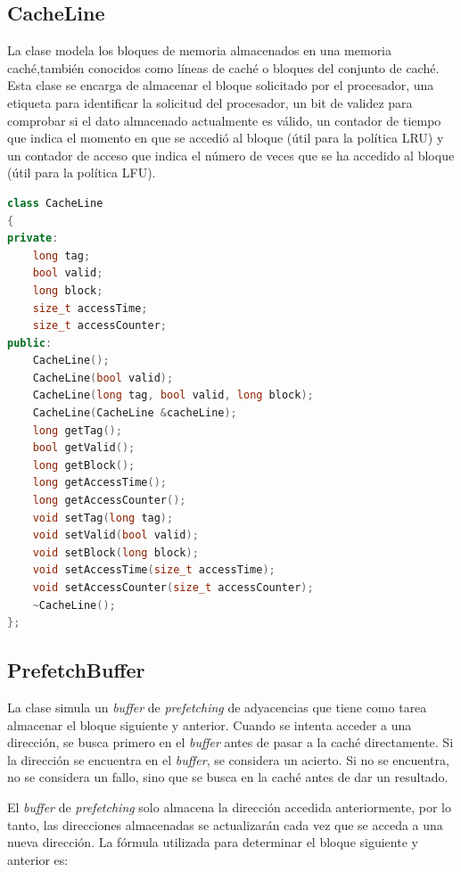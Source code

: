 \documentclass[12pt]{article}
\begin{document}
\subsection*{CacheLine}
\vspace{-5pt}
La clase modela los bloques de memoria almacenados en una memoria caché,también conocidos como líneas de caché o bloques del conjunto de caché. Esta clase se encarga de almacenar el bloque solicitado por el procesador, una etiqueta para identificar la solicitud del procesador, un bit de validez para comprobar si el dato almacenado actualmente es válido, un contador de tiempo que indica el momento en que se accedió al bloque (útil para la política LRU) y un contador de acceso que indica el número de veces que se ha accedido al bloque (útil para la política LFU).
\vspace{5pt}
\begin{lstlisting}[language=C++, caption={Declaración de la Clase \lstinline|CacheLine|}]
class CacheLine
{
private:
	long tag;
	bool valid;
	long block;
	size_t accessTime;
	size_t accessCounter;
public:
	CacheLine();
	CacheLine(bool valid);
	CacheLine(long tag, bool valid, long block);
	CacheLine(CacheLine &cacheLine);
	long getTag();
	bool getValid();
	long getBlock();
	long getAccessTime();
	long getAccessCounter();
	void setTag(long tag);
	void setValid(bool valid);
	void setBlock(long block);
	void setAccessTime(size_t accessTime);
	void setAccessCounter(size_t accessCounter);
	~CacheLine();
};
\end{lstlisting}
%
\subsection*{PrefetchBuffer}
\vspace{-5pt}
La clase simula un \textit{buffer} de \textit{prefetching} de adyacencias que tiene como tarea almacenar el bloque siguiente y anterior. Cuando se intenta acceder a una dirección, se busca primero en el \textit{buffer} antes de pasar a la caché directamente. Si la dirección se encuentra en el \textit{buffer}, se considera un acierto. Si no se encuentra, no se considera un fallo, sino que se busca en la caché antes de dar un resultado.

El \textit{buffer} de \textit{prefetching} solo almacena la dirección accedida anteriormente, por lo tanto, las direcciones almacenadas se actualizarán cada vez que se acceda a una nueva dirección. La fórmula utilizada para determinar el bloque siguiente y anterior es:
\end{document}
